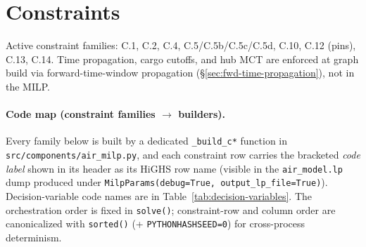 \documentclass[11pt,a4paper]{article}
\theoremstyle{definition}
\begin{document}
\section{Constraints}
\label{sec:constraints}

Active constraint families: C.1, C.2, C.4, C.5/C.5b/C.5c/C.5d, C.10, C.12 (pins),
C.13, C.14. Time propagation, cargo cutoffs, and hub MCT are enforced at graph build via
forward-time-window propagation (\S\ref{sec:fwd-time-propagation}), not in the MILP.

\paragraph{Code map (constraint families $\to$ builders).}
Every family below is built by a dedicated \texttt{\_build\_c*} function in
\texttt{src/components/air\_milp.py}, and each constraint row carries the bracketed
\emph{code label} shown in its header as its HiGHS row name (visible in the
\texttt{air\_model.lp} dump produced under \texttt{MilpParams(debug=True,\ output\_lp\_file=True)}).
Decision-variable code names are in Table~\ref{tab:decision-variables}. The orchestration order
is fixed in \texttt{solve()}; constraint-row and column order are canonicalized with
\texttt{sorted()} (+ \texttt{PYTHONHASHSEED=0}) for cross-process determinism.
\end{document}
